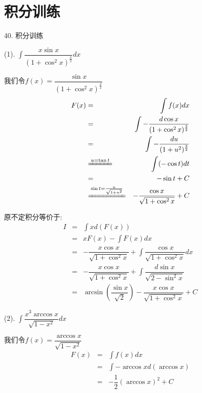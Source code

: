 \section{积分训练}
40. 积分训练
\begin{anymark}[积分训练]
	(1). $\int \dfrac{x\sin x}{(1+\cos^2x)^{\frac{3}{2}}}dx$
	\begin{solution}
		
		我们令$f(x)=\dfrac{\sin x}{(1+\cos^2x)^{\frac{3}{2}}}$
		\begin{eqnarray*}
			F(x)&=&\int f(x)dx\\
				&=&\int -\dfrac{d\cos x}{(1+\cos^2x)^{\frac{3}{2}}}\\
				&=&\int -\dfrac{du}{(1+u^2)^{\frac{3}{2}}}\\
				&\xlongequal{u=\tan t}&\int (-\cos t)dt\\
				&=&-\sin t+C\\
				&\xlongequal{\sin t=\frac{u}{\sqrt{1+u^2}}}&-\dfrac{\cos x}{\sqrt{1+\cos^2 x}}+C
		\end{eqnarray*}
		
		原不定积分等价于:  
		\begin{eqnarray*}
			I&=&\int xd(F(x))\\
			&=&xF(x)-\int F(x)dx\\
			&=&-\dfrac{x\cos x}{\sqrt{1+\cos^2 x}}+\int \dfrac{\cos x}{\sqrt{1+\cos^2 x}}dx\\
			&=&-\dfrac{x\cos x}{\sqrt{1+\cos^2 x}}+\int \dfrac{d\sin x}{\sqrt{2-\sin^2 x}}\\
			&=&\arcsin(\dfrac{\sin x}{\sqrt{2}})-\dfrac{x\cos x}{\sqrt{1+\cos^2 x}}+C
		\end{eqnarray*}
	\end{solution}
	(2). $\int \dfrac{x^3\arccos x}{\sqrt{1-x^2}}dx$
	\begin{solution}
		
		我们令$f(x)=\dfrac{\arccos x}{\sqrt{1-x^2}}$
		\begin{eqnarray*}
			F(x)&=&\int f(x)dx\\
			&=&\int -\arccos xd(\arccos x)\\
			&=&-\dfrac{1}{2}(\arccos x)^2+C
		\end{eqnarray*}
		

\end{solution}
\end{anymark}
